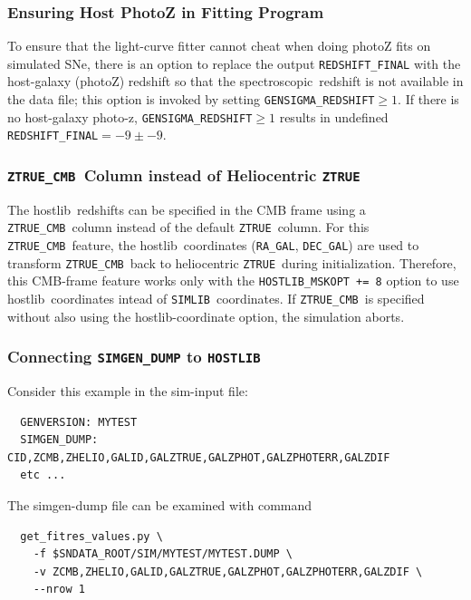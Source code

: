 \documentclass[12pt]{article}
\newcommand{\simlib}{{\tt SIMLIB}}
\newcommand{\hostlib}{{\sc hostlib}}
\newcommand{\spec}{spectroscopic}
\newcommand{\ztruecmb}{{\tt ZTRUE\_CMB}}
\newcommand{\ztrue}{{\tt ZTRUE}}
\begin{document}
{%
\subsubsection{Ensuring Host PhotoZ in Fitting Program}
\label{sss:hostlib_photoz}

To ensure that the light-curve fitter cannot cheat when doing
photoZ fits on simulated SNe, there is an option to replace the 
output {\tt REDSHIFT\_FINAL} with the host-galaxy (photoZ) redshift
so that the \spec\ redshift is not available in the data file;
this option is invoked by setting {\tt GENSIGMA\_REDSHIFT}$\ge 1$.
If there is no host-galaxy photo-z, {\tt GENSIGMA\_REDSHIFT}$\ge 1$
results in undefined {\tt REDSHIFT\_FINAL}$= -9 \pm -9$.


\label{sss:ZTRUE_CMB}
\subsubsection{\ztruecmb\ Column instead of Heliocentric {\ztrue} }

The \hostlib\ redshifts can be specified in the CMB frame using a
\ztruecmb\ column instead of the default \ztrue\ column.
For this \ztruecmb\ feature, the \hostlib\ coordinates 
({\tt RA\_GAL}, {\tt DEC\_GAL}) are used to transform
\ztruecmb\ back to heliocentric \ztrue\ during initialization.
Therefore, this CMB-frame feature works only with the {\tt HOSTLIB\_MSKOPT += 8}
option to use \hostlib\ coordinates intead of \simlib\ coordinates.
If \ztruecmb\ is specified without also using the
{\hostlib}-coordinate option, the simulation aborts.



\clearpage
\subsubsection{Connecting {\tt SIMGEN\_DUMP} to {\tt HOSTLIB} }
\label{sss:dump_to_hostlib}

Consider this example in the sim-input file:
\begin{verbatim}
  GENVERSION: MYTEST
  SIMGEN_DUMP: CID,ZCMB,ZHELIO,GALID,GALZTRUE,GALZPHOT,GALZPHOTERR,GALZDIF
  etc ...
\end{verbatim}
%
The simgen-dump file can be examined with command
\begin{verbatim}
  get_fitres_values.py \
    -f $SNDATA_ROOT/SIM/MYTEST/MYTEST.DUMP \
    -v ZCMB,ZHELIO,GALID,GALZTRUE,GALZPHOT,GALZPHOTERR,GALZDIF \
    --nrow 1


\end{verbatim}}
\end{document}
